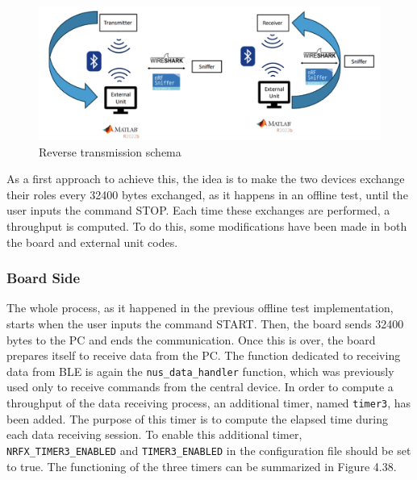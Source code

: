 \documentclass{Configuration_Files/PoliMi3i_thesis}
\begin{document}
\begin{figure}[H]
    \centering
    \includegraphics[scale=0.6]{Board Windows PC/9.png}
    \caption{Reverse transmission schema}
    \label{boardwindows_9}
\end{figure}

As a first approach to achieve this, the idea is to make the two devices exchange their roles every 32400 bytes exchanged, as it happens in an offline test, until the user inputs the command STOP. Each time these exchanges are performed, a throughput is computed. To do this, some modifications have been made in both the board and external unit codes.

\subsubsection{Board Side}

The whole process, as it happened in the previous offline test implementation, starts when the user inputs the command START. Then, the board sends 32400 bytes to the PC and ends the communication. Once this is over, the board prepares itself to receive data from the PC. The function dedicated to receiving data from BLE is again the \texttt{nus\_data\_handler} function, which was previously used only to receive commands from the central device. In order to compute a throughput of the data receiving process, an additional timer, named \texttt{timer3}, has been added. The purpose of this timer is to compute the elapsed time during each data receiving session. To enable this additional timer, \texttt{NRFX\_TIMER3\_ENABLED} and \texttt{TIMER3\_ENABLED} in the configuration file should be set to true. The functioning of the three timers can be summarized in Figure 4.38.
\end{document}
